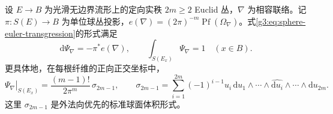 \begin{theorem}\label{g3:thm:sphere-euler-angular-form}
	设 \(E\to B\) 为光滑无边界流形上的定向实秩 \(2m\ge2\) Euclid 丛，\(\nabla\) 为相容联络。记 \(\pi:S(E)\to B\) 为单位球丛投影，\(e(\nabla)=(2\pi)^{-m}\operatorname{Pf}(\Omega_\nabla)\)。式\eqref{g3:eq:sphere-euler-transgression}的形式满足
	\[
		\mathrm d\Psi_\nabla=-\pi^*e(\nabla),\qquad
		\int_{S(E_x)}\Psi_\nabla=1\quad(x\in B).
	\]
	更具体地，在每根纤维的正向正交坐标中，
	\begin{equation}\label{g3:eq:sphere-angular-normalization}
		\left.\Psi_\nabla\right|_{S(E_x)}
		=\frac{(m-1)!}{2\pi^m}\,\sigma_{2m-1},
		\qquad
		\sigma_{2m-1}=
		\sum_{i=1}^{2m}(-1)^{i-1}u_i\,
		\mathrm du_1\wedge\cdots\wedge\widehat{\mathrm du_i}
		\wedge\cdots\wedge\mathrm du_{2m}.
	\end{equation}
	这里 \(\sigma_{2m-1}\) 是外法向优先的标准球面体积形式。
\end{theorem}
